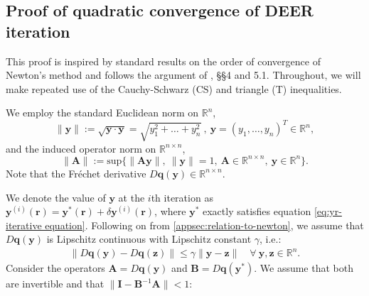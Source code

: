 \subsection{Proof of quadratic convergence of DEER iteration}
\label{appsec:proof-of-quadratic-convergence}

This proof is inspired by standard results on the order of convergence of Newton's method and follows the argument of \cite{kelley1995iterative}, \S\S4 and 5.1. Throughout, we will make repeated use of the Cauchy-Schwarz (CS) and triangle (T) inequalities. 

We employ the standard Euclidean norm on $\mathbb{R}^n$,
\begin{equation}
    \big \| \mathbf{y} \big \| := \sqrt{\mathbf{y} \cdot \mathbf{y}} = \sqrt{y_1^2 + \dots + y_n^2} \ , \ \mathbf{y} = (y_1, \dots, y_n)^T \in \mathbb{R}^n,
\end{equation}
and the induced operator norm on $\mathbb{R}^{n \times n}$,
\begin{equation}
    \big \| \mathbf{A} \big \| := \textrm{sup} \big \{ \big \| \mathbf{Ay} \big \|, \ \big \| \mathbf{y} \big \| = 1, \ \mathbf{A} \in \mathbb{R}^{n \times n}, \ \mathbf{y} \in \mathbb{R}^{n} \big \}.
\end{equation}
Note that the Fr\'{e}chet derivative $D\mathbf{q}(\mathbf{y}) \in \mathbb{R}^{n \times n}$.

We denote the value of $\mathbf{y}$ at the $i$th iteration as $\mathbf{y}^{(i)}(\mathbf{r}) = \mathbf{y}^*(\mathbf{r})+\delta\mathbf{y}^{(i)}(\mathbf{r})$, where $\mathbf{y}^*$ exactly satisfies equation \ref{eq:yr-iterative equation}. Following on from \ref{appsec:relation-to-newton}, we assume that $D\mathbf{q}(\mathbf{y})$ is Lipschitz continuous with Lipschitz constant $\gamma$, i.e.:
\begin{align}
\label{eq:lipschitz}
    \big \| D\mathbf{q}(\mathbf{y}) - D\mathbf{q}(\mathbf{z}) \big \| \le \gamma \big \| \mathbf{y} - \mathbf{z} \big \| \quad \forall \ \mathbf{y}, \mathbf{z} \in \mathbb{R}^n.
\end{align}
Consider the operators $\mathbf{A} = D\mathbf{q}(\mathbf{y})$ and $\mathbf{B} = D\mathbf{q}(\mathbf{y}^*)$. We assume that both are invertible and that $\big \| \mathbf{I} - \mathbf{B}^{-1}\mathbf{A} \big \|  < 1$:

